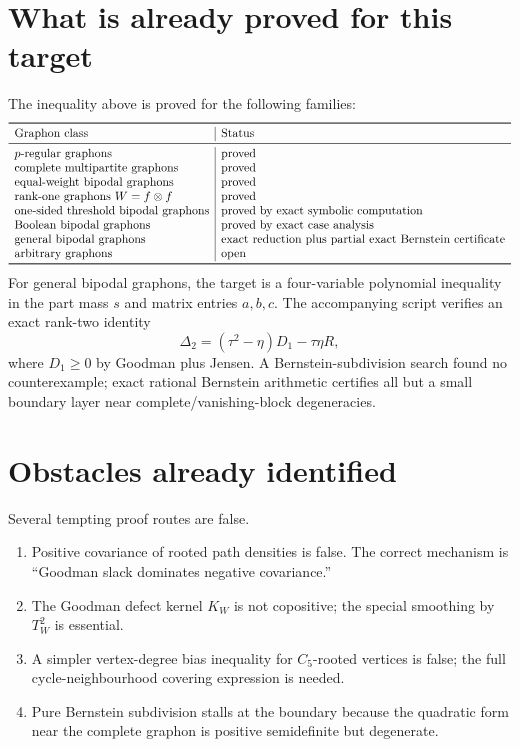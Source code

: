 \documentclass[11pt]{article}
\begin{document}
\section*{What is already proved for this target}
The inequality above is proved for the following families:
\[
\begin{array}{l|l}
\toprule
\text{Graphon class} & \text{Status}\\
\midrule
p\text{-regular graphons} & \text{proved}\\
\text{complete multipartite graphons} & \text{proved}\\
\text{equal-weight bipodal graphons} & \text{proved}\\
\text{rank-one graphons }W=f\otimes f & \text{proved}\\
\text{one-sided threshold bipodal graphons} & \text{proved by exact symbolic computation}\\
\text{Boolean bipodal graphons} & \text{proved by exact case analysis}\\
\text{general bipodal graphons} & \text{exact reduction plus partial exact Bernstein certificate}\\
\text{arbitrary graphons} & \text{open}\\
\bottomrule
\end{array}
\]
For general bipodal graphons, the target is a four-variable polynomial inequality in the part mass $s$ and matrix entries $a,b,c$.  The accompanying script verifies an exact rank-two identity
\[
        \Delta_2=(\tau^2-\eta)D_1-\tau\eta R,
\]
where $D_1\ge0$ by Goodman plus Jensen.  A Bernstein-subdivision search found no counterexample; exact rational Bernstein arithmetic certifies all but a small boundary layer near complete/vanishing-block degeneracies.

\section*{Obstacles already identified}
Several tempting proof routes are false.
\begin{enumerate}[leftmargin=*]
\item Positive covariance of rooted path densities is false.  The correct mechanism is ``Goodman slack dominates negative covariance.''
\item The Goodman defect kernel $K_W$ is not copositive; the special smoothing by $T_W^2$ is essential.
\item A simpler vertex-degree bias inequality for $C_5$-rooted vertices is false; the full cycle-neighbourhood covering expression is needed.
\item Pure Bernstein subdivision stalls at the boundary because the quadratic form near the complete graphon is positive semidefinite but degenerate.
\end{enumerate}
\end{document}
